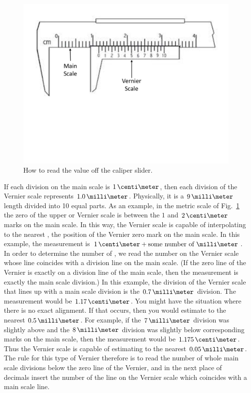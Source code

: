 \begin{figure}
  \begin{center}
    \includegraphics[width=5in]{IntroductionFigures/VernierCalipers02a.pdf}
  \end{center}
  \caption{How to read the value off the caliper slider.}
  \label{VernierFig02}  %
\end{figure}

If each division on the main scale is $1\,\centi\meter$, then each division of the Vernier scale represents $1.0\,\milli\meter$.  Physically, it is a $9\,\milli\meter$ length divided into 10 equal parts. As an example, in the metric scale of Fig.~\ref{VernierFig02} the zero of the upper or Vernier scale is between the $1$ and $2\,\centi\meter$ marks on the main scale.  In this way, the Vernier scale is capable of interpolating to the nearest \milli\meter, the position of the Vernier zero mark on the main scale.  In this example, the measurement is  $1\,\centi\meter + \mbox{some number of \milli\meter}$.  In order to determine the number of \milli\meter, we read the number on the Vernier scale whose line coincides with a \centi\meter division line on the main scale.  (If the zero line of the Vernier is exactly on a division line of the main scale, then the measurement is exactly the main scale division.)  In this example, the division of the Vernier scale that lines up with a main scale division is the $0.7\,\milli\meter$ division.  The measurement would be $1.17\,\centi\meter$. You might have the situation where there is no exact alignment.  If that occurs, then you would estimate to the nearest $0.5\,\milli\meter$.  For example, if the $7\,\milli\meter$ division was slightly above and the $8\,\milli\meter$ division was slightly below corresponding marks on the main scale, then the measurement would be $1.175\,\centi\meter$.  Thus the Vernier scale is capable of estimating to the nearest $0.05\,\milli\meter$.  The rule for this type of Vernier therefore is to read the number of whole main scale divisions below the zero line of the Vernier, and in the next place of decimals insert the number of the line on the Vernier scale which coincides with a main scale line.

